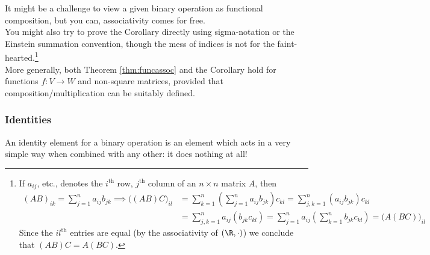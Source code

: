 	
It might be a challenge to view a given binary operation as functional composition, but you can, associativity comes for free.\\
	
You might also try to prove the Corollary directly using sigma-notation or the Einstein summation convention, though the mess of indices is not for the faint-hearted.\footnote{If $a_{ij}$, etc., denotes the $i^{\text{th}}$ row, $j^{\text{th}}$ column of an $n\times n$ matrix $A$, then
	\begin{align*}
	(AB)_{ik}=\sum_{j=1}^n a_{ij}b_{jk}\implies \bigl((AB)C\bigr)_{il}&=\sum_{k=1}^n\left(\sum_{j=1}^na_{ij}b_{jk}\right)c_{kl}=\sum_{j,k=1}^n(a_{ij}b_{jk})c_{kl}\\
	&=\sum_{j,k=1}^na_{ij}(b_{jk}c_{kl}) =\sum_{j=1}^na_{ij}\left(\sum_{k=1}^nb_{jk}c_{kl}\right) =\bigl(A(BC)\bigr)_{il}
	\end{align*}
Since the $il^\text{th}$ entries are equal (by the associativity of $(\R,\cdot)$) we conclude that $(AB)C=A(BC)$.}\\

More generally, both Theorem \ref{thm:funcassoc} and the Corollary hold for functions $f:V\to W$ and non-square matrices, provided that composition/multiplication can be suitably defined.

\subsubsection*{Identities}

An identity element for a binary operation is an element which acts in a very simple way when combined with any other: it does nothing at all!

